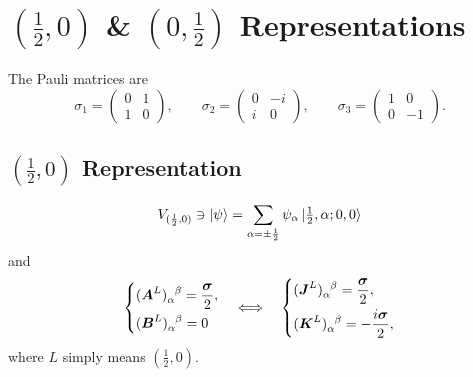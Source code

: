 \section{\texorpdfstring{$(\frac{1}{2}, 0)$ \& $(0, \frac{1}{2})$ Representations}{(1/2,0) and (0,1/2) Representations}}
\begin{framed}
    The Pauli matrices are
    \begin{equation}
        \sigma_1 = \begin{pmatrix} 0 & 1 \\
            1 & 0
        \end{pmatrix}, \qquad
        \sigma_2 = \begin{pmatrix} 0 & - i \\
            i & 0
        \end{pmatrix}, \qquad
        \sigma_3 = \begin{pmatrix} 1 & 0 \\
            0 & - 1
        \end{pmatrix}.
    \end{equation}
\end{framed}
\subsection{\texorpdfstring{$(\frac{1}{2}, 0)$ Representation}{(1/2,0) Representation}}
\begin{equation}
    V_{(\frac{1}{2}, 0)} \ni \ket{\psi} = \sum_{\alpha = \pm \frac{1}{2}} \psi_\alpha \ket{\tfrac{1}{2}, \alpha; 0, 0}
\end{equation}
and
\begin{equation}
    \begin{dcases}
        \tensor{(\boldsymbol{A}^L)}{_\alpha^\beta} = \frac{\boldsymbol{\sigma}}{2}, \\
        \tensor{(\boldsymbol{B}^L)}{_\alpha^\beta} = 0
    \end{dcases}
    \quad \Longleftrightarrow \quad
    \begin{dcases}
        \tensor{(\boldsymbol{J}^L)}{_\alpha^\beta} = \frac{\boldsymbol{\sigma}}{2}, \\
        \tensor{(\boldsymbol{K}^L)}{_\alpha^\beta} = - \frac{i \boldsymbol{\sigma}}{2},
    \end{dcases}
\end{equation}
where $L$ simply means $(\frac{1}{2}, 0)$.

